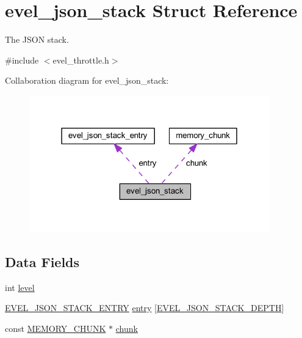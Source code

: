 \hypertarget{structevel__json__stack}{}\section{evel\+\_\+json\+\_\+stack Struct Reference}
\label{structevel__json__stack}


The J\+S\+ON stack.  




{\ttfamily \#include $<$evel\+\_\+throttle.\+h$>$}



Collaboration diagram for evel\+\_\+json\+\_\+stack\+:
\nopagebreak
\begin{figure}[H]
\begin{center}
\leavevmode
\includegraphics[width=295pt]{structevel__json__stack__coll__graph}
\end{center}
\end{figure}
\subsection*{Data Fields}
\begin{DoxyCompactItemize}
\item 
int \hyperlink{structevel__json__stack_adf0214de1c5281c7625b38deb2f36ae5}{level}
\item 
\hyperlink{evel__throttle_8h_a939516501c869cb7bf42624ecedc0d72}{E\+V\+E\+L\+\_\+\+J\+S\+O\+N\+\_\+\+S\+T\+A\+C\+K\+\_\+\+E\+N\+T\+RY} \hyperlink{structevel__json__stack_a18a5fdb90795b73d7df945d9829060e9}{entry} \mbox{[}\hyperlink{evel__throttle_8h_ab296e08c356d8b4c8ab601866127a5f9}{E\+V\+E\+L\+\_\+\+J\+S\+O\+N\+\_\+\+S\+T\+A\+C\+K\+\_\+\+D\+E\+P\+TH}\mbox{]}
\item 
const \hyperlink{evel__internal_8h_a552c2b2d2e73d39eb2d79328296f7d5f}{M\+E\+M\+O\+R\+Y\+\_\+\+C\+H\+U\+NK} $\ast$ \hyperlink{structevel__json__stack_ab94b10ac7e31de53b2086c97ef6f70b9}{chunk}
\end{DoxyCompactItemize}


